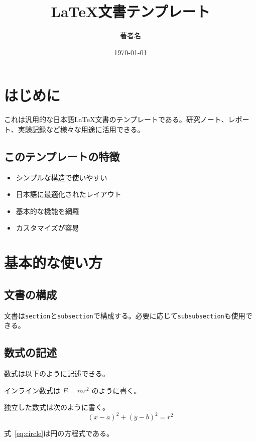\documentclass[dvipdfmx,uplatex,a4paper,10pt]{jsarticle}
\title{LaTeX文書テンプレート}
\author{著者名}
\date{\today}
\begin{document}
\maketitle

\tableofcontents
\newpage

\section{はじめに}

これは汎用的な日本語LaTeX文書のテンプレートである。研究ノート、レポート、実験記録など様々な用途に活用できる。

\subsection{このテンプレートの特徴}

\begin{itemize}
\item シンプルな構造で使いやすい
\item 日本語に最適化されたレイアウト
\item 基本的な機能を網羅
\item カスタマイズが容易
\end{itemize}

\section{基本的な使い方}

\subsection{文書の構成}

文書は\texttt{section}と\texttt{subsection}で構成する。必要に応じて\texttt{subsubsection}も使用できる。

\subsection{数式の記述}

数式は以下のように記述できる。

インライン数式は $E = mc^2$ のように書く。

独立した数式は次のように書く。
\begin{equation}
(x - a)^2 + (y - b)^2 = r^2
\label{eq:circle}
\end{equation}

式~\ref{eq:circle}は円の方程式である。
\end{document}
